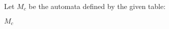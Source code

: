 Let $M_c$ be the automata defined by the given table:
\begin{automata}{$M_c$}
	
	
	
	
	
	
	
	
	
\end{automata}